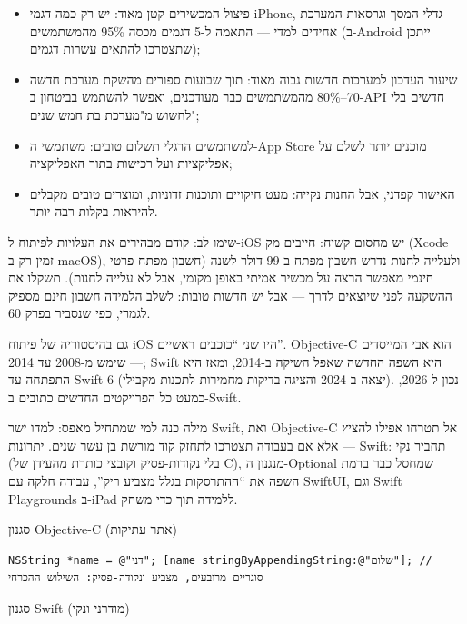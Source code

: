 \begin{itemize}
  \item פיצול המכשירים קטן מאוד: יש רק כמה דגמי iPhone, גדלי המסך וגרסאות המערכת אחידים למדי — התאמה ל-5 דגמים מכסה 95\% מהמשתמשים (ב-Android ייתכן שתצטרכו להתאים עשרות דגמים);
  \item שיעור העדכון למערכות חדשות גבוה מאוד: תוך שבועות ספורים מהשקת מערכת חדשה 70–80\% מהמשתמשים כבר מעודכנים, ואפשר להשתמש בביטחון ב-API חדשים בלי לחשוש מ"מערכת בת חמש שנים";
  \item למשתמשים הרגלי תשלום טובים: משתמשי ה-App Store מוכנים יותר לשלם על אפליקציות ועל רכישות בתוך האפליקציה;
  \item האישור קפדני, אבל החנות נקייה: מעט חיקויים ותוכנות זדוניות, ומוצרים טובים מקבלים להיראות בקלות רבה יותר.
\end{itemize}

\begin{tcbwarn}{שימו לב: קודם מבהירים את העלויות}
לפיתוח ל-iOS יש מחסום קשיח: חייבים מק (Xcode זמין רק ב-macOS), ולעלייה לחנות נדרש חשבון מפתח ב-99 דולר לשנה (חשבון מפתח פרטי חינמי מאפשר הרצה על מכשיר אמיתי באופן מקומי, אבל לא עלייה לחנות). תשקלו את ההשקעה לפני שיוצאים לדרך — אבל יש חדשות טובות: לשלב הלמידה חשבון חינם מספיק לגמרי, כפי שנסביר בפרק 60.

\end{tcbwarn}


גם בהיסטוריה של פיתוח iOS היו שני “כוכבים ראשיים”. Objective-C הוא אבי המייסדים — שימש מ-2008 עד 2014; Swift היא השפה החדשה שאפל השיקה ב-2014, ומאז היא התפתחה עד Swift 6 (יצאה ב-2024 והציגה בדיקות מחמירות לתכנות מקבילי). נכון ל-2026, כמעט כל הפרויקטים החדשים כתובים ב-Swift.

מילה כנה למי שמתחיל מאפס: למדו ישר Swift, ואת Objective-C אל תטרחו אפילו להציץ — אלא אם בעבודה תצטרכו לתחזק קוד מורשת בן עשר שנים. יתרונות Swift: תחביר נקי (בלי נקודות-פסיק וקובצי כותרת מהעידן של C), מנגנון ה-Optional שמחסל כבר ברמת השפה את “ההתרסקות בגלל מצביע ריק”, עבודה חלקה עם SwiftUI, וגם Swift Playgrounds ב-iPad ללמידה תוך כדי משחק.

סגנון Objective-C (אתר עתיקות)

\begin{lstlisting}
NSString *name = @"דני"; [name stringByAppendingString:@"שלום"]; // סוגריים מרובעים, מצביע ונקודה-פסיק: השילוש ההכרחי
\end{lstlisting}

סגנון Swift (מודרני ונקי)


